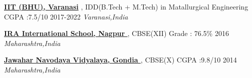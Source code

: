 
\begin{cventries}
  \cventry
   
    {
      \begin{cvitems} %
         \item {\textbf{\href{https://iitbhu.ac.in/}{\small IIT (BHU), Varanasi} },  \footnotesize IDD(B.Tech + M.Tech) in Matallurgical Engineering 
         \hspace{0.7cm}
         \footnotesize CGPA :7.5/10 \hspace{1.2cm} \footnotesize 2017-2022
         \hspace{0.7cm}
         \textit{\textcolor{awesome-skyblue}{Varanasi,India}}}
         \vspace{1.5mm} 
         \item {\textbf{\href{https://www.irainternationalschool.ac.in/}{\small IRA International School, Nagpur }}, \footnotesize    CBSE(XII)\hspace{3.7cm}
         \footnotesize Grade : 76.5\%
         \hspace{1.8cm} \footnotesize 2016
         \hspace{0.4cm}
         \textit{\textcolor{awesome-skyblue}{Maharashtra,India}}} 
         \vspace{1.5mm}
         \item {\textbf{\href{https://www.jnvgondia.org/}{\small Jawahar Navodaya Vidyalaya, Gondia }}, \footnotesize CBSE(X) \hspace{3.2cm}
         \footnotesize CGPA :9.8/10
         \hspace{1.8cm} \footnotesize 2014
         \hspace{0.4cm}
         \textit{\textcolor{awesome-skyblue}{Maharashtra,India}}\vspace{0.3cm}}
         
      \end{cvitems}
    }
\end{cventries}
